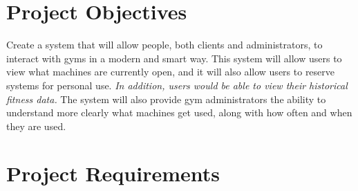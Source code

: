 \documentclass[letterpaper,11pt]{./templates/texMemo} %
\begin{document}
\maketitle

\section{Project Objectives}

Create a system that will allow people, both clients and administrators, to interact with gyms in a modern and smart way.
This system will allow users to view what machines are currently open, 
    and it will also allow users to reserve systems for personal use. 
\textit{In addition, users would be able to view their historical fitness data.}
The system will also provide gym administrators the ability to understand more clearly what machines get used,
    along with how often and when they are used.

\section{Project Requirements}
\end{document}
